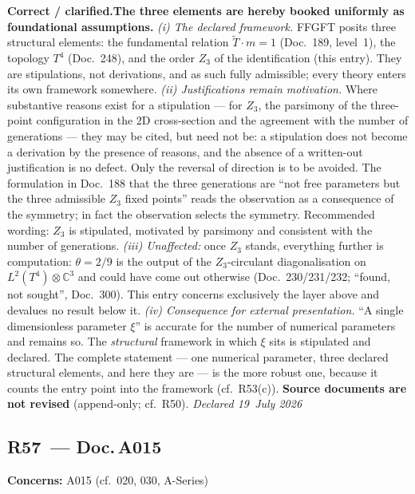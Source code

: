 \smallskip\noindent\textbf{Correct / clarified.}\quad \textbf{The three elements are hereby booked uniformly as foundational assumptions.} \emph{(i) The declared framework.} FFGFT posits three structural elements: the fundamental relation $\tilde{T}\cdot m = 1$ (Doc.~189, level~1), the topology $T^4$ (Doc.~248), and the order $Z_3$ of the identification (this entry). They are stipulations, not derivations, and as such fully admissible; every theory enters its own framework somewhere. \emph{(ii) Justifications remain motivation.} Where substantive reasons exist for a stipulation --- for $Z_3$, the parsimony of the three-point configuration in the $2$D cross-section and the agreement with the number of generations --- they may be cited, but need not be: a stipulation does not become a derivation by the presence of reasons, and the absence of a written-out justification is no defect. Only the reversal of direction is to be avoided. The formulation in Doc.~188 that the three generations are \enquote{not free parameters but the three admissible $Z_3$ fixed points} reads the observation as a consequence of the symmetry; in fact the observation selects the symmetry. Recommended wording: $Z_3$ is stipulated, motivated by parsimony and consistent with the number of generations. \emph{(iii) Unaffected:} once $Z_3$ stands, everything further is computation: $\theta = 2/9$ is the output of the $Z_3$-circulant diagonalisation on $L^2(T^4)\otimes\mathbb{C}^3$ and could have come out otherwise (Doc.~230/231/232; \enquote{found, not sought}, Doc.~300). This entry concerns exclusively the layer above and devalues no result below it. \emph{(iv) Consequence for external presentation.} \enquote{A single dimensionless parameter $\xi$} is accurate for the number of numerical parameters and remains so. The \emph{structural} framework in which $\xi$ sits is stipulated and declared. The complete statement --- one numerical parameter, three declared structural elements, and here they are --- is the more robust one, because it counts the entry point into the framework (cf.\ R53(c)). \textbf{Source documents are not revised} (append-only; cf.\ R50). \emph{Declared 19~July 2026}


\medskip


\subsection*{R57~--- Doc.\,A015}

\noindent\textbf{Concerns:} A015 (cf.\ 020, 030, A-Series)


